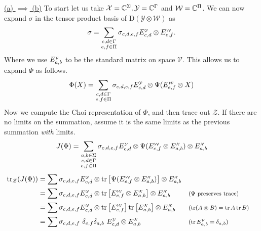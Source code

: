 \documentclass[boxes,pages,color=SeaGreen]{homework}
\newcommand{\X}{\mathcal{X}}
\newcommand{\Y}{\mathcal{Y}}
\newcommand{\Z}{\mathcal{Z}}
\newcommand{\W}{\mathcal{W}}
\newcommand{\V}{\mathcal{V}}
\newcommand{\Density}{\mathrm{D}}
\begin{document}
\begin{solution}
    \hyperref[part:4a]{(a) $\implies$ (b)}
    To start let us take $\X = \C^\Sigma, \Y = \C^\Gamma$ and $\W = \C^\Pi$.
    We can now expand $\sigma$ in the tensor product basis of $\Density(\Y\otimes\W)$ as
    \begin{equation}\label{eq:sigma}
        \sigma = \sum_{\substack{c,d\in\Gamma \\ e,f \in\Pi}}\sigma_{c,d,e,f}\standmat{c,d}{\Y} \otimes \standmat{e,f}{\W}.
    \end{equation}
    Where we use $\standmat{a,b}{\V}$ to be the standard matrix on space $\V$.
    This allows us to expand $\Phi$ as follows.
    \begin{equation*}
        \Phi(X) = \sum_{\substack{c,d\in\Gamma \\ e,f\in\Pi}} \sigma_{c,d,e,f}\standmat{c,d}{\Y} \otimes \Psi(\standmat{e,f}{\W}\otimes X)
    \end{equation*}
    Now we compute the Choi representation of $\Phi$, and then trace out $\Z$.
    If there are no limits on the summation, assume it is the same limits as the previous summation \emph{with} limits.
    \begin{equation*}
        J(\Phi) = \sum_{\substack{a,b\in\Sigma \\ c,d\in\Gamma \\ e,f\in\Pi}}\sigma_{c,d,e,f}\standmat{c,d}{\Y}\otimes \Psi(\standmat{e,f}{\W}\otimes\standmat{a,b}{\X})\otimes \standmat{a,b}{\X} \\
    \end{equation*}
    \begin{align*}
        \tr_\Z(J(\Phi)) & = \sum\sigma_{c,d,e,f}\standmat{c,d}{\Y}\otimes \tr\qty[\Psi(\standmat{e,f}{\W}\otimes\standmat{a,b}{\X})]\otimes \standmat{a,b}{\X}                                                                    \\
                        & = \sum\sigma_{c,d,e,f}\standmat{c,d}{\Y}\otimes \tr\qty[\standmat{e,f}{\W}\otimes\standmat{a,b}{\X}]\otimes \standmat{a,b}{\X}       &  & \text{\footnotesize ($\Psi$ preserves trace)}                 \\
                        & = \sum\sigma_{c,d,e,f}\standmat{c,d}{\Y}\otimes \tr\qty[\standmat{e,f}{\W}]\tr\qty[\standmat{a,b}{\X}]\otimes \standmat{a,b}{\X}     &  & \text{\footnotesize ($\tr(A\otimes B) = \tr A \tr B$)}        \\
                        & = \sum\sigma_{c,d,e,f}\,\,\delta_{e,f}\delta_{a,b}\,\,\standmat{c,d}{\Y}\otimes \standmat{a,b}{\X}                                   &  & \text{\footnotesize ($\tr\standmat{a,b}{\V} = \delta_{a,b}$)} \\

\end{align*}
\end{solution}
\end{document}
